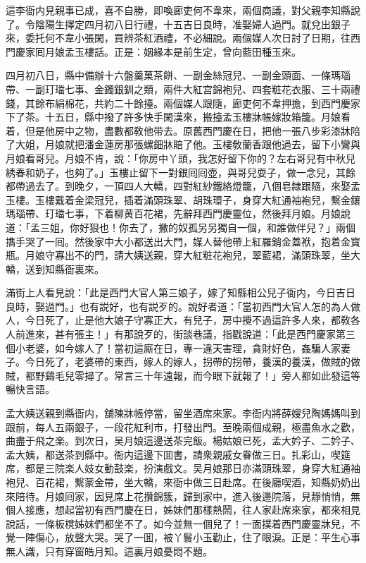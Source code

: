 這李衙内見親事已成，喜不自勝，即喚廊吏何不韋來，兩個商議，對父親李知縣說了。令陰陽生擇定四月初八日行禮，十五吉日良時，准娶婦人過門。就兌出銀子來，委托何不韋小張閑，買辨茶紅酒禮，不必細說。兩個媒人次日討了日期，往西門慶家囘月娘孟玉樓話。正是：姻緣本是前生定，曾向藍田種玉來。

四月初八日，縣中備辦十六盤羹菓茶餅、一副金絲冠兒、一副金頭面、一條瑪瑙帶、一副玎璫七事、金鐲銀釧之類，兩件大紅宫錦袍兒、四套粧花衣服、三十兩禮錢，其餘布絹棉花，共約二十餘擡。兩個媒人跟隨，廊吏何不韋押擔，到西門慶家下了茶。十五日，縣中撥了許多快手閑漢來，搬擡孟玉樓牀帳嫁妝箱籠。月娘看着，但是他房中之物，盡數都敎他带去。原舊西門慶在日，把他一張八步彩漆牀陪了大姐，月娘就把潘金蓮房那張螺鈿牀賠了他。玉樓敎蘭香跟他過去，留下小鸞與月娘看哥兒。月娘不肯，說：「你房中丫頭，我怎好留下你的？左右哥兒有中秋兒綉春和奶子，也夠了。」玉樓止留下一對銀囘囘壺，與哥兒耍子，做一念兒，其餘都帶過去了。到晚夕，一頂四人大轎，四對紅紗鐵絡燈籠，八個皂隸跟隨，來娶孟玉樓。玉樓戴着金梁冠兒，插着滿頭珠翠、胡珠環子，身穿大紅通袖袍兒，繫金鑲瑪瑙帶、玎璫七事，下着柳黄百花裙，先辭拜西門慶靈位，然後拜月娘。月娘說道：「孟三姐，你好狠也！你去了，撇的奴孤另另獨自一個，和誰做伴兒？」兩個㩦手哭了一囘。然後家中大小都送出大門，媒人替他帶上紅羅銷金蓋袱，抱着金寳瓶。月娘守寡出不的門，請大姨送親，穿大紅粧花袍兒，翠藍裙，滿頭珠翠，坐大轎，送到知縣衙裏來。

滿街上人看見說：「此是西門大官人第三娘子，嫁了知縣相公兒子衙内，今日吉日良時，娶過門。」也有説好，也有説歹的。說好者道：「當初西門大官人怎的為人做人，今日死了，止是他大娘子守寡正大，有兒子，房中攪不過這許多人來，都敎各人前進來，甚有張主！」有那說歹的，街談巷議，指戳說道：「此是西門慶家第三個小老婆，如今嫁人了！當初這廝在日，專一違天害理，貪財好色，姦騙人家妻子。今日死了，老婆帶的東西，嫁人的嫁人，拐帶的拐帶，養漢的養漢，做賊的做賊，都野鷄毛兒零撏了。常言三十年遠報，而今眼下就報了！」旁人都如此發這等暢快言語。

孟大姨送親到縣衙内，舖陳牀帳停當，留坐酒席來家。李衙内將薛嫂兒陶媽媽叫到跟前，每人五兩銀子，一段花紅利市，打發出門。至晚兩個成親，極盡魚水之歡，曲盡于飛之楽。到次日，吴月娘這邊送茶完飯。楊姑娘已死，孟大妗子、二妗子、孟大姨，都送茶到縣中。衙内這邊下囬書，請衆親戚女眷做三日。扎彩山，喫筵席，都是三院楽人妓女動鼓楽，扮演戲文。吴月娘那日亦滿頭珠翠，身穿大紅通袖袍兒、百花裙，繫蒙金帶，坐大轎，來衙中做三日赴席。在後廳喫酒，知縣奶奶出來陪待。月娘囘家，因見席上花攢錦簇，歸到家中，進入後邊院落，見靜悄悄，無個人接應，想起當初有西門慶在日，姊妹們那樣熱鬧，往人家赴席來家，都來相見說話，一條板櫈姊妹們都坐不了。如今並無一個兒了！一面撲着西門慶靈牀兒，不覺一陣傷心，放聲大哭。哭了一囬，被丫鬟小玉勸止，住了眼淚。正是：平生心事無人識，只有穿窗皓月知。這裏月娘憂悶不題。

